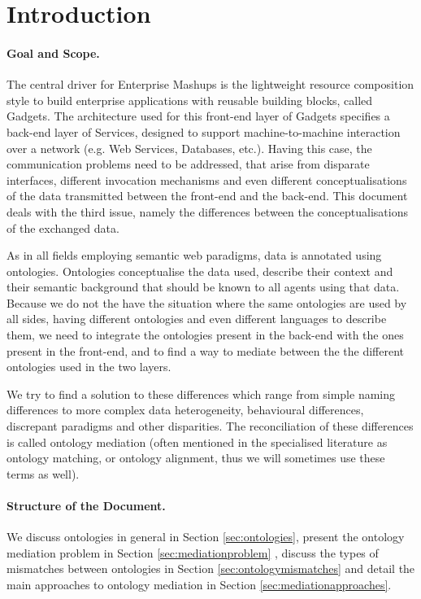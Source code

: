 \documentclass{fast_latex}
\begin{document}
\section{Introduction} %
\label{sec:introduction}
\paragraph{Goal and Scope.}
The central driver for Enterprise Mashups is the lightweight resource
composition style to build enterprise applications with reusable
building blocks, called Gadgets. The architecture used for this
front-end layer of Gadgets specifies a back-end layer of Services,
designed to support machine-to-machine interaction over a network (e.g.
Web Services, Databases, etc.). Having this case, the communication
problems need to be addressed, that arise from disparate interfaces,
different invocation mechanisms and even different conceptualisations
of the data transmitted between the front-end and the back-end. This
document deals with the third issue, namely the differences between the
conceptualisations of the exchanged data.

As in all fields employing semantic web paradigms, data is annotated
using ontologies. Ontologies conceptualise the data used, describe
their context and their semantic background that should be known to all
agents using that data. Because we do not the have the situation where
the same ontologies are used by all sides, having different ontologies
and even different languages to describe them, we need to integrate the
ontologies present in the back-end with the ones present in the
front-end, and to find a way to mediate between the the different
ontologies used in the two layers. 

We try to find a solution to these differences which range from simple
naming differences to more complex data heterogeneity, behavioural
differences, discrepant paradigms and other disparities. The
reconciliation of these differences is called ontology mediation (often
mentioned in the specialised literature as ontology matching, or
ontology alignment, thus we will sometimes use these terms as well). 
\paragraph{Structure of the Document.}
We discuss ontologies in general in Section \ref{sec:ontologies}, present the ontology
mediation problem in Section \ref{sec:mediationproblem} , discuss the types of mismatches between
ontologies in Section \ref{sec:ontologymismatches} and detail the main approaches to ontology
mediation in Section \ref{sec:mediationapproaches}.
\end{document}
